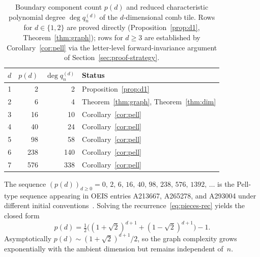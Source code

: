 \documentclass{amsart}
\theoremstyle{definition}
\theoremstyle{remark}
\begin{document}
\begin{table}[h]
\centering
\caption{Boundary component count $p(d)$ and reduced
  characteristic polynomial degree $\deg q_n^{(d)}$ of the
  $d$-dimensional comb tile.  Rows for $d \in \{1, 2\}$ are
  proved directly (Proposition~\ref{prop:d1},
  Theorem~\ref{thm:graph}); rows for $d \ge 3$ are established
  by Corollary~\ref{cor:pell} via
  the letter-level forward-invariance argument of
  Section~\ref{sec:proof-strategy}.}
\label{tab:pieces}
\begin{tabular}{rrrl}
\toprule
$d$ & $p(d)$ & $\deg q_n^{(d)}$ & Status \\
\midrule
1 &     2 &    2 & Proposition~\ref{prop:d1} \\
2 &     6 &    4 & Theorem~\ref{thm:graph}, Theorem~\ref{thm:dim} \\
3 &    16 &   10 & Corollary~\ref{cor:pell} \\
4 &    40 &   24 & Corollary~\ref{cor:pell} \\
5 &    98 &   58 & Corollary~\ref{cor:pell} \\
6 &   238 &  140 & Corollary~\ref{cor:pell} \\
7 &   576 &  338 & Corollary~\ref{cor:pell} \\
\bottomrule
\end{tabular}
\end{table}

The sequence
$(p(d))_{d\ge 0} = 0,\, 2,\, 6,\, 16,\, 40,\, 98,\, 238,\, 576,\,
1392,\, \ldots$
is the Pell-type sequence appearing in OEIS entries
A213667, A265278, and A293004 under different initial
conventions~\cite{oeis-A213667,oeis-A265278,oeis-A293004}.
Solving the recurrence~\eqref{eq:pieces-rec} yields the closed form
\begin{equation}\label{eq:pieces-closed}
  p(d)
  = \tfrac{1}{2}\bigl((1{+}\sqrt{2})^{d+1}
                      + (1{-}\sqrt{2})^{d+1}\bigr) - 1.
\end{equation}
Asymptotically $p(d) \sim (1{+}\sqrt{2})^{d+1}/2$, so the graph
complexity grows exponentially with the ambient dimension but
remains independent of~$n$.
\end{document}
